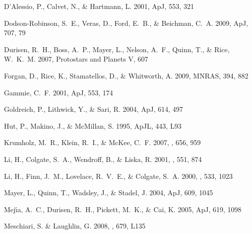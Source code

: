 \documentclass[12pt,manuscript,authoryear]{aastex}
\begin{document}
\begin{thebibliography}{48}
{D'Alessio}, P., {Calvet}, N., \& {Hartmann}, L. 2001, ApJ, 553, 321

{Dodson-Robinson}, S.~E., {Veras}, D., {Ford}, E.~B., \& {Beichman}, C.~A.
  2009, ApJ, 707, 79

{Durisen}, R.~H., {Boss}, A.~P., {Mayer}, L., {Nelson}, A.~F., {Quinn}, T., \&
  {Rice}, W.~K.~M. 2007, Protostars and Planets V, 607

{Forgan}, D., {Rice}, K., {Stamatellos}, D., \& {Whitworth}, A. 2009, MNRAS,
  394, 882

{Gammie}, C.~F. 2001, ApJ, 553, 174

{Goldreich}, P., {Lithwick}, Y., \& {Sari}, R. 2004, ApJ, 614, 497

{Hut}, P., {Makino}, J., \& {McMillan}, S. 1995, ApJL, 443, L93

{Krumholz}, M.~R., {Klein}, R.~I., \& {McKee}, C.~F. 2007, \apj, 656, 959

{Li}, H., {Colgate}, S.~A., {Wendroff}, B., \& {Liska}, R. 2001, \apj, 551, 874

{Li}, H., {Finn}, J.~M., {Lovelace}, R.~V.~E., \& {Colgate}, S.~A. 2000, \apj,
  533, 1023

{Mayer}, L., {Quinn}, T., {Wadsley}, J., \& {Stadel}, J. 2004, ApJ, 609, 1045

{Mej{\'{\i}}a}, A.~C., {Durisen}, R.~H., {Pickett}, M.~K., \& {Cai}, K. 2005,
  ApJ, 619, 1098

{Meschiari}, S. \& {Laughlin}, G. 2008, \apjl, 679, L135


\end{thebibliography}
\end{document}
